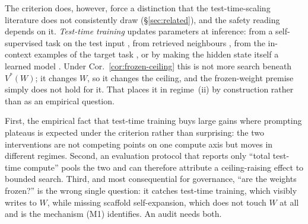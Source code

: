 The criterion does, however, force a distinction that the test-time-scaling literature does not consistently draw (\S\ref{sec:related}), and the safety reading depends on it. \emph{Test-time training} updates parameters at inference: from a self-supervised task on the test input \citep{sun2019testtime}, from retrieved neighbours \citep{hardt2023nearest, hubotter2024efficiently}, from the in-context examples of the target task \citep{akyurek2024testtime}, or by making the hidden state itself a learned model \citep{sun2024learning}. Under Cor.~\ref{cor:frozen-ceiling} this is not more search beneath $V^*(W)$; it changes $W$, so it changes the ceiling, and the frozen-weight premise simply does not hold for it. That places it in regime~(ii) by construction rather than as an empirical question.

First, the empirical fact that test-time training buys large gains where prompting plateaus \citep{akyurek2024testtime} is expected under the criterion rather than surprising: the two interventions are not competing points on one compute axis but moves in different regimes. Second, an evaluation protocol that reports only ``total test-time compute'' pools the two and can therefore attribute a ceiling-raising effect to bounded search. Third, and most consequential for governance, ``are the weights frozen?'' is the wrong single question: it catches test-time training, which visibly writes to $W$, while missing scaffold self-expansion, which does not touch $W$ at all and is the mechanism (M1) identifies. An audit needs both.
